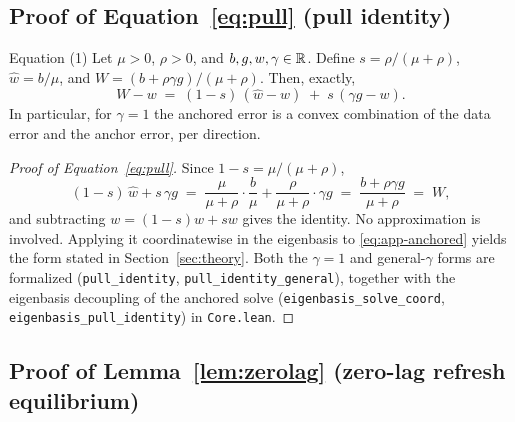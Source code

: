 \subsection{Proof of Equation~\eqref{eq:pull} (pull identity)}
\label{app:proof-pull}

\begin{restated}{Equation (1)}
Let $\mu > 0$, $\rho > 0$, and $b, g, w, \gamma \in \mathbb{R}$.
Define $s = \rho/(\mu + \rho)$, $\widehat w = b/\mu$, and $W = (b + \rho \gamma g)/(\mu + \rho)$.
Then, exactly,
\[
  W - w \;=\; (1 - s)\,(\widehat w - w) \;+\; s\,(\gamma g - w).
\]
In particular, for $\gamma = 1$ the anchored error is a convex combination of the data error and the anchor error, per direction.
\end{restated}

\begin{proof}[Proof of Equation~\eqref{eq:pull}]
Since $1 - s = \mu/(\mu + \rho)$,
\[
  (1 - s)\,\widehat w + s\,\gamma g
  \;=\; \frac{\mu}{\mu + \rho}\cdot\frac{b}{\mu}
        + \frac{\rho}{\mu + \rho}\cdot \gamma g
  \;=\; \frac{b + \rho \gamma g}{\mu + \rho}
  \;=\; W,
\]
and subtracting $w = (1-s)w + s w$ gives the identity.
No approximation is involved.
Applying it coordinatewise in the eigenbasis to \eqref{eq:app-anchored} yields the form stated in Section~\ref{sec:theory}.
Both the $\gamma = 1$ and general-$\gamma$ forms are formalized (\texttt{pull\_identity}, \texttt{pull\_identity\_general}), together with the eigenbasis decoupling of the anchored solve (\texttt{eigenbasis\_solve\_coord}, \texttt{eigenbasis\_pull\_identity}) in \texttt{Core.lean}.
\end{proof}

\subsection{Proof of Lemma~\ref{lem:zerolag} (zero-lag refresh equilibrium)}
\label{app:proof-tracking}

